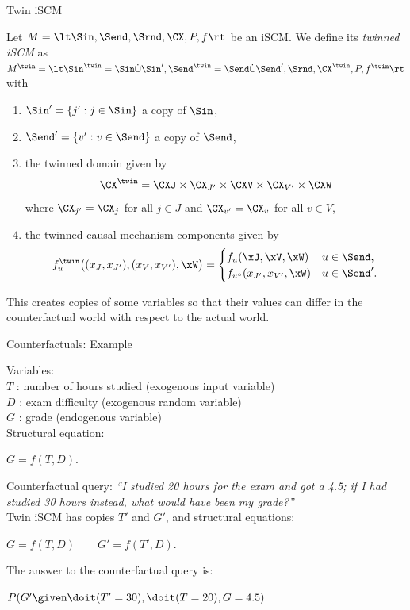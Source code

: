 \begin{frame}{Twin iSCM}
  \begin{Def}[\ref{def:twin_scm}]
  Let $M = \lt \Sin, \Send, \Srnd, \CX, P, f \rt$ be an iSCM. We define its \emph{twinned iSCM} as
    $M^\twin = \lt \Sin^\twin = \Sin \dot\cup \Sin', \Send^\twin = \Send \dot\cup \Send', \Srnd, \CX^\twin, P, f^\twin \rt$
  with
  \begin{enumerate}
    \item $\Sin' = \{j' : j \in \Sin\}$ a copy of $\Sin$,
    \item $\Send' = \{v' : v \in \Send\}$ a copy of $\Send$,
    \item the twinned domain given by
  $$\CX^\twin = \CXJ \times \CX_{J'} \times \CXV \times \CX_{V'} \times \CXW$$
  where $\CX_{j'} = \CX_j$ for all $j \in J$ and $\CX_{v'} = \CX_v$ for all $v \in V$,
    \item the twinned causal mechanism components given by
      \vspace{-0.5\baselineskip}
    $$f^\twin_u\big((x_J,x_{J'}),(x_V,x_{V'}),\xW\big) = 
    \begin{cases}
      f_u(\xJ,\xV,\xW) & u \in \Send,  \\
      f_{u^\circ}(x_{J'},x_{V'},\xW) & u \in \Send'.
    \end{cases}$$
  \end{enumerate}
  \end{Def}
  This creates copies of some variables so that their values can differ in the counterfactual world with respect to the actual world.
\end{frame}


\begin{frame}{Counterfactuals: Example}
  \begin{example}
  Variables:\\
    \quad $T$ : number of hours studied (exogenous input variable)\\
    \quad $D$ : exam difficulty (exogenous random variable)\\
    \quad $G$ : grade (endogenous variable)\\
  Structural equation:\\
  \smallskip
  \centerline{$G = f(T,D).$}
  \smallskip
  Counterfactual query: {\it ``I studied 20 hours for the exam and
got a 4.5; if I had studied 30 hours instead, what would have been my grade?''}\\

    \medskip
    Twin iSCM has copies $T'$ and $G'$, and structural equations:\\
    \smallskip
    \centerline{$G = f(T,D) \qquad G' = f(T',D).$}
    \smallskip
    The answer to the counterfactual query is:\\
    \smallskip
    \centerline{$P(G' \given \doit(T'=30), \doit(T=20), G=4.5)$}
    \smallskip
  \end{example}
\end{frame}

